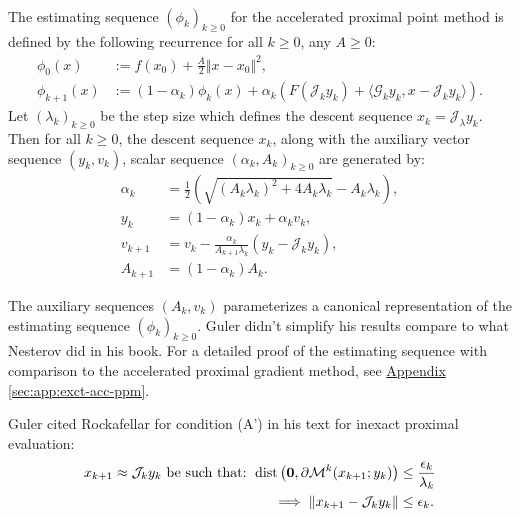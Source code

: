\documentclass[12pt]{article}
\begin{document}
    \begin{definition}\label{def:nes-est-seq-acc-ppm}
        \; \\
        The estimating sequence  $(\phi_k)_{k \ge0}$ for the accelerated proximal point method is defined by the following recurrence for all $k \ge0$, any $A \ge 0$: 
        \begin{align*}
            \phi_0(x) &:= f(x_0) + \frac{A}{2}\Vert x - x_0\Vert^2, 
            \\
            \phi_{k + 1}(x) &:= 
            (1 - \alpha_k)\phi_k(x)
            + 
            \alpha_k(F(\mathcal J_k y_k) + \langle \mathcal G_k y_k, x - \mathcal J_k y_k\rangle).    
        \end{align*}
        Let $(\lambda_k)_{k \ge 0}$ be the step size which defines the descent sequence $x_k = \mathcal J_\lambda y_k$. 
        Then for all $k \ge 0$, the descent sequence $x_k$, along with the auxiliary vector sequence $(y_k, v_k)$, scalar sequence $(\alpha_k, A_k)_{k\ge 0}$ are generated by: 
        \begin{align*}
            \alpha_k &= \frac{1}{2}\left(
                \sqrt{(A_k\lambda_k)^2 + 4A_k \lambda_k}
                - A_k\lambda_k
            \right), 
            \\
            y_k &= (1 - \alpha_k)x_k + \alpha_k v_k, 
            \\
            v_{k + 1}
            &= 
            v_k - \frac{\alpha_k}{A_{k + 1}\lambda_k}(y_k - \mathcal J_k y_k), 
            \\
            A_{k + 1} &= (1 - \alpha_k)A_k. 
        \end{align*}
    \end{definition}
    \begin{remark}
        The auxiliary sequences $(A_k, v_k)$ parameterizes a canonical representation of the estimating sequence $(\phi_k)_{k \ge0}$. 
        Guler didn't simplify his results compare to what Nesterov did in his book. 
        For a detailed proof of the estimating sequence with comparison to the accelerated proximal gradient method, see 
        \hyperref[sec:app:exct-acc-ppm]{Appendix \ref*{sec:app:exct-acc-ppm}}. 
    \end{remark}
    Guler cited Rockafellar \cite{rockafellar_monotone_1976} for condition (A') in his text for inexact proximal evaluation: 
    \begin{align*}
        x_{k + 1}\approx \mathcal J_{k} y_k \text{ be such that: }
        \operatorname{dist}\left(
            \mathbf 0, \partial \mathcal M^{k}(x_{k + 1}; y_k)
        \right) &\le \frac{\epsilon_k}{\lambda_k}
        \\
        \implies 
        \Vert x_{k + 1} - \mathcal J_{k}y_k\Vert 
        &\le \epsilon_k. 
    \end{align*}
\end{document}
